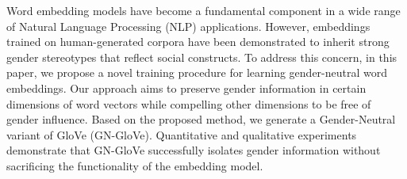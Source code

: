 Word embedding models have become a fundamental component in a wide range of Natural Language Processing (NLP) applications. However, embeddings trained on human-generated corpora have been demonstrated to inherit strong gender stereotypes that reflect social constructs. To address this concern, in this paper, we propose a novel training procedure for learning gender-neutral word embeddings. Our approach aims to preserve gender information in certain dimensions of word vectors while compelling other dimensions to be free of gender influence. Based on the proposed method, we generate a Gender-Neutral variant of GloVe (GN-GloVe). Quantitative and qualitative experiments demonstrate that GN-GloVe successfully isolates gender information without sacrificing the functionality of the embedding model.
